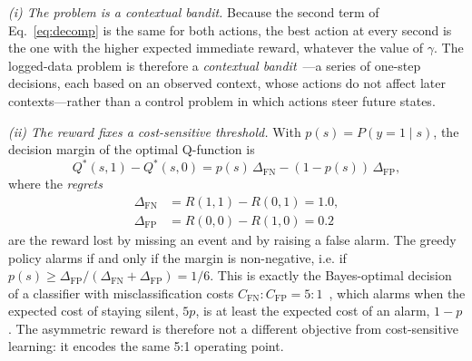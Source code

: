 \emph{(i) The problem is a contextual bandit.} Because the second term of Eq.~\eqref{eq:decomp} is the same for both actions, the best action at every second is the one with the higher expected immediate reward, whatever the value of $\gamma$. The logged-data problem is therefore a \emph{contextual bandit}~\cite{lattimore2020bandit}---a series of one-step decisions, each based on an observed context, whose actions do not affect later contexts---rather than a control problem in which actions steer future states.

\emph{(ii) The reward fixes a cost-sensitive threshold.} With $p(s)=P(y=1\mid s)$, the decision margin of the optimal Q-function is
\begin{equation}
Q^*(s,1)-Q^*(s,0)=p(s)\,\Delta_{\mathrm{FN}}-(1-p(s))\,\Delta_{\mathrm{FP}},
\label{eq:margin}
\end{equation}
where the \emph{regrets}
\begin{equation}
\begin{aligned}
\Delta_{\mathrm{FN}}&=R(1,1)-R(0,1)=1.0,\\
\Delta_{\mathrm{FP}}&=R(0,0)-R(1,0)=0.2
\end{aligned}
\label{eq:regret}
\end{equation}
are the reward lost by missing an event and by raising a false alarm. The greedy policy alarms if and only if the margin is non-negative, i.e. if $p(s)\ge \Delta_{\mathrm{FP}}/(\Delta_{\mathrm{FN}}+\Delta_{\mathrm{FP}})=1/6$. This is exactly the Bayes-optimal decision of a classifier with misclassification costs $C_{\mathrm{FN}}:C_{\mathrm{FP}}=5:1$~\cite{elkan2001cost}, which alarms when the expected cost of staying silent, $5p$, is at least the expected cost of an alarm, $1-p$. The asymmetric reward is therefore not a different objective from cost-sensitive learning: it encodes the same 5:1 operating point.

